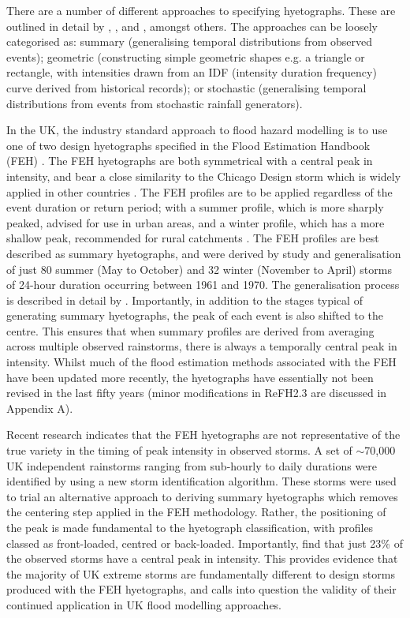\documentclass[APA,Times2COL]{WileyNJDv5}
\begin{document}
There are a number of different approaches to specifying hyetographs. These are outlined in detail by \citet{chow1988applied}, \citet{veneziano1999best}, and \citet{balbastre2019comparison}, amongst others. The approaches can be loosely categorised as: summary (generalising temporal distributions from observed events); geometric (constructing simple geometric shapes e.g. a triangle or rectangle, with intensities drawn from an IDF (intensity duration frequency) curve derived from historical records); or stochastic (generalising temporal distributions from events from stochastic rainfall generators).

In the UK, the industry standard approach to flood hazard modelling is to use one of two design hyetographs specified in the Flood Estimation Handbook (FEH) \citep{faulkner1999}. The FEH hyetographs are both symmetrical with a central peak in intensity, and bear a close similarity to the Chicago Design storm which is widely applied in other countries \citep{keifer1957synthetic, watt2013critical, yang2020linking}. The FEH profiles are to be applied regardless of the event duration or return period; with a summer profile, which is more sharply peaked, advised for use in urban areas, and a winter profile, which has a more shallow peak, recommended for rural catchments \citep{faulkner1999}. The FEH profiles are best described as summary hyetographs, and were derived by study and generalisation of just 80 summer (May to October) and 32 winter (November to April) storms of 24-hour duration occurring between 1961 and 1970. The generalisation process is described in detail by \citet{villalobos2023towards}. Importantly, in addition to the stages typical of generating summary hyetographs, the peak of each event is also shifted to the centre. This ensures that when summary profiles are derived from averaging across multiple observed rainstorms, there is always a temporally central peak in intensity. Whilst much of the flood estimation methods associated with the FEH have been updated more recently, the hyetographs have essentially not been revised in the last fifty years (minor modifications in ReFH2.3 are discussed in Appendix A). 

Recent research indicates that the FEH hyetographs are not representative of the true variety in the timing of peak intensity in observed storms. A set of $\sim$70,000 UK independent rainstorms ranging from sub-hourly to daily durations were identified by \citet{villalobos2023creation} using a new storm identification algorithm. These storms were used to trial an alternative approach to deriving summary hyetographs which removes the centering step applied in the FEH methodology. Rather, the positioning of the peak is made fundamental to the hyetograph classification, with profiles classed as front-loaded, centred or back-loaded. Importantly, \citet{villalobos2023towards} find that just 23\% of the observed storms have a central peak in intensity. This provides evidence that the majority of UK extreme storms are fundamentally different to design storms produced with the FEH hyetographs, and calls into question the validity of their continued application in UK flood modelling approaches. 
\end{document}
